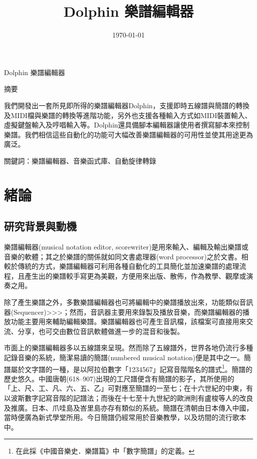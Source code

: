 \documentclass[12pt,a4paper,oneside]{report}
\begin{document}
\title{Dolphin 樂譜編輯器}
\date{\today}
\maketitle

\begin{center}
Dolphin 樂譜編輯器

摘要
\end{center}

我們開發出一套所見即所得的樂譜編輯器Dolphin，支援即時五線譜與簡譜的轉換及MIDI檔與樂譜的轉換等進階功能，另外也支援各種輸入方式如MIDI裝置輸入、虛擬鍵盤輸入及哼唱輸入等。Dolphin還具備腳本編輯器讓使用者撰寫腳本來控制樂譜。我們相信這些自動化的功能可大幅改善樂譜編輯器的可用性並使其用途更為廣泛。

關鍵詞：樂譜編輯器、音樂函式庫、自動旋律轉錄


\tableofcontents

\chapter{緒論}
\section{研究背景與動機}

樂譜編輯器(musical notation editor, scorewriter)是用來輸入、編輯及輸出樂譜或音樂的軟體；其之於樂譜的關係就如同文書處理器(word processor)之於文書。相較於傳統的方式，樂譜編輯器可利用各種自動化的工具簡化並加速樂譜的處理流程，且產生出的樂譜較手寫更為美觀，方便用來出版、散佈，作為教學、觀摩或演奏之用。

除了產生樂譜之外，多數樂譜編輯器也可將編輯中的樂譜播放出來，功能類似音訊器(Sequencer)>>>；然而，音訊器主要用來錄製及播放音樂，而樂譜編輯器的播放功能主要用來輔助編輯樂譜。樂譜編輯器也可產生音訊檔，該檔案可直接用來交流、分享，也可交由數位音訊軟體做進一步的混音和後製。

市面上的樂譜編輯器多以五線譜來呈現。然而除了五線譜外，世界各地仍流行多種記錄音樂的系統，簡潔易讀的簡譜(numbered musical notation)便是其中之一。簡譜屬於文字譜的一種\cite{chinaEncyclopedia}，是以阿拉伯數字「1234567」記寫音階階名的譜式\footnote{在此採《中國音樂史．樂譜篇》中「數字簡譜」\cite{chinaMusicHistory}的定義。}。簡譜的歷史悠久。中國唐朝(618–907)出現的工尺譜便含有簡譜的影子，其所使用的「上、尺、工、凡、六、五、乙」可對應至簡譜的一至七\cite{wiki}；在十六世紀的中東，有以波斯數字記寫音階的記譜法；而後在十七至十九世紀的歐洲則有盧梭等人的改良及推廣。日本、爪哇島及峇里島亦存有類似的系統\cite{britannica}。簡譜在清朝由日本傳入中國，當時便廣為新式學堂所用。今日簡譜仍經常用於音樂教學，以及坊間的流行歌本中。
\end{document}
